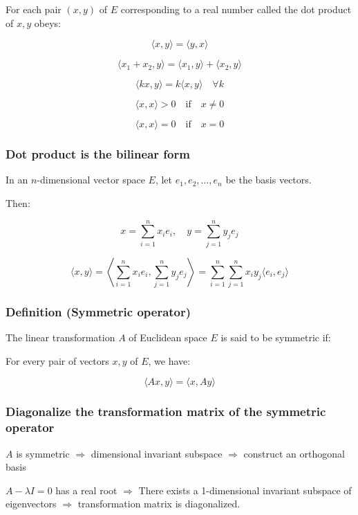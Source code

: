 For each pair $(x, y)$ of $E$ corresponding to a real number called the dot product of $x, y$ obeys:

\[
\langle x, y \rangle = \langle y, x \rangle
\]

\[
\langle x_1 + x_2, y \rangle = \langle x_1, y \rangle + \langle x_2, y \rangle
\]

\[
\langle kx, y \rangle = k \langle x, y \rangle \quad \forall k
\]

\[
\langle x, x \rangle > 0 \quad \text{if} \quad x \neq 0
\]

\[
\langle x, x \rangle = 0 \quad \text{if} \quad x = 0
\]


\subsubsection{Dot product is the bilinear form}

In an $n$-dimensional vector space $E$, let $e_1, e_2, \ldots, e_n$ be the basis vectors.

Then:

\[
x = \sum_{i=1}^n x_i e_i, \quad y = \sum_{j=1}^n y_j e_j
\]

\[
\langle x, y \rangle = \left\langle \sum_{i=1}^n x_i e_i, \sum_{j=1}^n y_j e_j \right\rangle = \sum_{i=1}^n \sum_{j=1}^n x_i y_j \langle e_i, e_j \rangle
\]

\subsubsection{Definition (Symmetric operator)}

The linear transformation $A$ of Euclidean space $E$ is said to be symmetric if:

For every pair of vectors $x, y$ of $E$, we have:

\[
\langle Ax, y \rangle = \langle x, Ay \rangle
\]



\subsubsection{Diagonalize the transformation matrix of the symmetric operator}

$A$ is symmetric $\Rightarrow$ dimensional invariant subspace $\Rightarrow$ construct an orthogonal basis

$A - \lambda I = 0$ has a real root $\Rightarrow$ There exists a 1-dimensional invariant subspace of eigenvectors $\Rightarrow$ transformation matrix is diagonalized.


